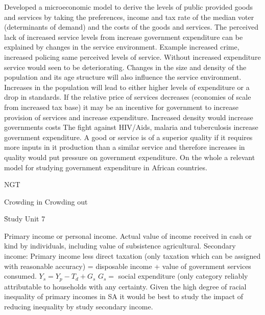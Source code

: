 \documentclass[12pt]{examnotes}
\begin{document}
\ra  Developed a microeconomic model to derive the levels of public provided goods and services by taking the preferences, income and tax rate of the median voter (determinants of demand) and the costs of the goods and services.
\ra The perceived lack of increased service levels from increase government expenditure can be explained by changes in the service environment.
\ra Example increased crime, increased policing same perceived levels of service. Without increased expenditure service would seen to be deteriorating.
\ra Changes in the size and density of the population and its age structure will also influence the service environment.
\rna Increases in the population will lead to either higher levels of expenditure or a drop in standards.
\rna If the relative price of services decreases (economies of scale from increased tax base) it may be an incentive for government to increase provision of services and increase expenditure.
\rna Increased density would increase governments costs
\rna The fight against HIV/Aids, malaria and tuberculosis increase government expenditure.
\ra A good or service is of a superior quality if it requires more inputs in it production than a similar service and therefore increases in quality would put pressure on government expenditure.
\ra On the whole a relevant model for studying government expenditure in African countries.

\ra {} 

\ra NGT  

\ra Crowding in  
\ra Crowding out  

\h{Study Unit 7}

\ra Primary income or personal income. Actual value of income received in cash or kind by individuals, including value of subsistence agricultural.
\ra Secondary income: Primary income less direct taxation (only taxation which can be assigned with reasonable accuracy) = disposable income + value of government services consumed.
\ra $Y_s=Y_p-T_d+G_s$ \quad $G_s=$ social expenditure (only category reliably attributable to households with any certainty.
\ra Given the high degree of racial inequality of primary incomes in SA it would be best to study the impact of reducing inequality by study secondary income.
\end{document}
